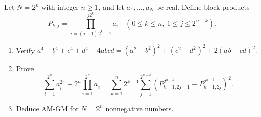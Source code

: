 Let $N=2^n$ with integer $n\ge1$, and let $a_1,\ldots,a_N$ be real. Define block products
\[
P_{k,j}=\prod_{i=(j-1)2^k+1}^{j2^k}a_i
\quad(0\le k\le n,\ 1\le j\le2^{n-k}).
\]
\begin{enumerate}
\item Verify $a^4+b^4+c^4+d^4-4abcd=(a^2-b^2)^2+(c^2-d^2)^2+2(ab-cd)^2$.
\item Prove
\[
\sum_{i=1}^{2^n}a_i^{2^n}-2^n\prod_{i=1}^{2^n}a_i
=\sum_{k=1}^n2^{k-1}\sum_{j=1}^{2^{n-k}}
\left(P_{k-1,2j-1}^{2^{n-k}}-P_{k-1,2j}^{2^{n-k}}\right)^2.
\]
\item Deduce AM-GM for $N=2^n$ nonnegative numbers.
\end{enumerate}
